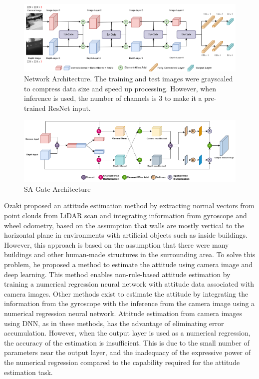  \begin{figure}[!t]
    \centering
    \includegraphics[scale=0.38]{./figure/2_method/SII2023_network_overall_2.png}
    \caption{Network Architecture. The training and test images were grayscaled to compress data size and speed up processing. However, when inference is used, the number of channels is 3 to make it a pre-trained ResNet input.}
    \label{fig:network_overall}
\end{figure}

 \begin{figure}[!t]
    \centering
    \includegraphics[scale=0.38]{./figure/2_method/sa_gate.png}
    \caption{SA-Gate Architecture}
    \label{fig:sagate_overall}
\end{figure}

Ozaki proposed an attitude estimation method by extracting normal vectors from point clouds from LiDAR scan and integrating information from gyroscope and wheel odometry, based on the assumption that walls are mostly vertical to the horizontal plane in environments with artificial objects such as inside buildings\cite{ozaki_lidar_normal}. However, this approach is based on the assumption that there were many buildings and other human-made structures in the surrounding area. To solve this problem, he proposed a method to estimate the attitude using camera image and deep learning\cite{Ozaki_SII2021}. This method enables non-rule-based attitude estimation by training a numerical regression neural network with attitude data associated with camera images. Other methods exist to estimate the attitude by integrating the information from the gyroscope with the inference from the camera image using a numerical regression neural network\cite{ozaki_springer}. Attitude estimation from camera images using DNN, as in these methods, has the advantage of eliminating error accumulation. However, when the output layer is used as a numerical regression, the accuracy of the estimation is insufficient. This is due to the small number of parameters near the output layer, and the inadequacy of the expressive power of the numerical regression compared to the capability required for the attitude estimation task.

